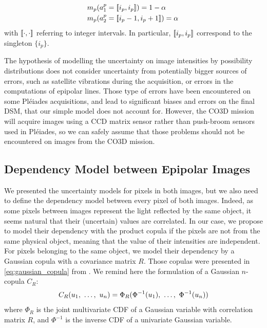 \begin{eqnarray}
    &m_p(a^p_1=[\![ i_p, i_p]\!])=1-\alpha\,\nonumber\\
    &m_p(a^p_2=[\![ i_p-1, i_p + 1]\!])=\alpha\,\label{eq:pixel_mass}
\end{eqnarray}
with $[\![\cdot, \cdot]\!]$ referring to integer intervals. In particular, $[\![ i_p, i_p]\!]$ correspond to the singleton $\{i_p\}$.

\begin{remark}
    The hypothesis of modelling the uncertainty on image intensities by possibility distributions does not consider uncertainty from potentially bigger sources of errors, such as satellite vibrations during the acquisition, or errors in the computations of epipolar lines. Those type of errors have been encountered on some Pléiades acquisitions, and lead to significant biases and errors on the final DSM, that our simple model does not account for. However, the CO3D mission will acquire images using a CCD matrix sensor rather than push-broom sensors used in Pléiades, so we can safely assume that those problems should not be encountered on images from the CO3D mission.
\end{remark}


\subsection{Dependency Model between Epipolar Images}
We presented the uncertainty models for pixels in both images, but we also need to define the dependency model between every pixel of both images. Indeed, as some pixels between images represent the light reflected by the same object, it seems natural that their (uncertain) values are correlated. In our case, we propose to model their dependency with the product copula if the pixels are not from the same physical object, meaning that the value of their intensities are independent. For pixels belonging to the same object, we model their dependency by a Gaussian copula with a covariance matrix $R$. Those copulas were presented in \cref{eq:gaussian_copula} from . We remind here the formulation of a Gaussian $n$-copula $C_R$:
\begin{align}
    C_R(u_1 , ~\dots, ~ u_n)=\Phi_R(\Phi^{-1}(u_1) , ~\dots, ~ \Phi^{-1}(u_n))\label{eq:gaussian_copula}
\end{align} where $\Phi_R$ is the joint multivariate CDF of a Gaussian variable with correlation matrix $R$, and $\Phi^{-1}$ is the inverse CDF of a univariate Gaussian variable.

